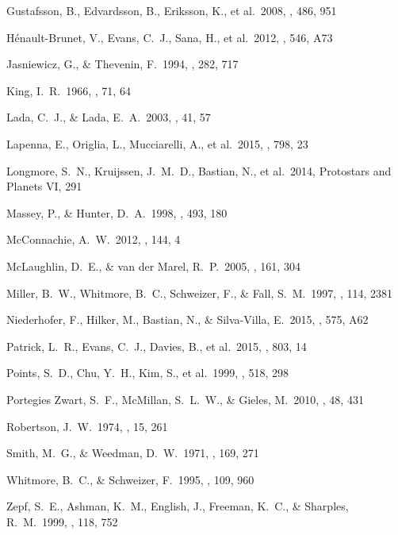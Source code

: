\documentclass[useAMS,usenatbib]{mn2e}
\begin{document}
\begin{thebibliography}{99}
 Gustafsson, B., Edvardsson, B., Eriksson, K., et al.\ 2008, \aap, 486, 951

 H{\'e}nault-Brunet, V., Evans, C.~J., Sana, H., et al.\ 2012, \aap, 546, A73

 Jasniewicz, G., \& Thevenin, F.\ 1994, \aap, 282, 717

 King, I.~R.\ 1966, \aj, 71, 64

 Lada, C.~J., \& Lada, E.~A.\ 2003, \araa, 41, 57

 Lapenna, E., Origlia,
L., Mucciarelli, A., et al.\ 2015, \apj, 798, 23

 Longmore, S.~N.,
Kruijssen, J.~M.~D., Bastian, N., et al.\ 2014, Protostars and Planets VI,
291

 Massey, P., \& Hunter, D.~A.\ 1998, \apj, 493, 180

 McConnachie, A.~W.\ 2012,
\aj, 144, 4

 McLaughlin, D.~E., \& van der Marel, R.~P.\ 2005, \apjs, 161, 304

 Miller, B.~W., Whitmore,
B.~C., Schweizer, F., \& Fall, S.~M.\ 1997, \aj, 114, 2381

 Niederhofer, F., Hilker, M., Bastian, N., \& Silva-Villa, E.\ 2015, \aap, 575, A62

 Patrick, L.~R., Evans,
C.~J., Davies, B., et al.\ 2015, \apj, 803, 14

 Points, S.~D., Chu,
Y.~H., Kim, S., et al.\ 1999, \apj, 518, 298

 Portegies Zwart, S.~F., McMillan, S.~L.~W., \& Gieles, M.\ 2010, \araa, 48, 431

 Robertson, J.~W.\ 1974, \aaps, 15, 261

 Smith, M.~G., \& Weedman, D.~W.\ 1971, \apj, 169, 271

 Whitmore, B.~C., \& Schweizer, F.\ 1995, \aj, 109, 960

 Zepf, S.~E., Ashman,
K.~M., English, J., Freeman, K.~C., \& Sharples, R.~M.\ 1999, \aj, 118, 752
\end{thebibliography}
\label{lastpage}
\end{document}
